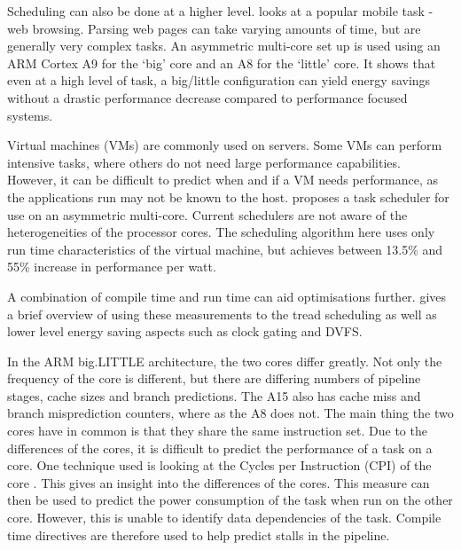 Scheduling can also be done at a higher level. 
\cite{zhu2013high} looks at a popular mobile task - web browsing. 
Parsing web pages can take varying amounts of time, but are generally very complex tasks. 
An asymmetric multi-core set up is used using an ARM Cortex A9 for the `big' core and an A8 for the `little' core. 
It shows that even at a high level of task, a big/little configuration can yield energy savings without a drastic performance decrease compared to performance focused systems.

Virtual machines (VMs) are commonly used on servers. 
Some VMs can perform intensive tasks, where others do not need large performance capabilities.
However, it can be difficult to predict when and if a VM needs performance, as the applications run may not be known to the host. 
\cite{wang2012energy} proposes a task scheduler for use on an asymmetric multi-core. 
Current schedulers are not aware of the heterogeneities of the processor cores. 
The scheduling algorithm here uses only run time characteristics of the virtual machine, but achieves between 13.5\% and 55\% increase in performance per watt.

A combination of compile time and run time can aid optimisations further. 
\cite{de2012power} gives a brief overview of using these measurements to the tread scheduling as well as lower level energy saving aspects such as clock gating and DVFS. 


In the ARM big.LITTLE architecture, the two cores differ greatly. 
Not only the frequency of the core is different, but there are differing numbers of pipeline stages, cache sizes and branch predictions.
The A15 also has cache miss and branch misprediction counters, where as the A8 does not. 
The main thing the two cores have in common is that they share the same instruction set. 
Due to the differences of the cores, it is difficult to predict the performance of a task on a core.
One technique used is looking at the Cycles per Instruction (CPI) of the core \cite{pricopi2013power}. 
This gives an insight into the differences of the cores. 
This measure can then be used to predict the power consumption of the task when run on the other core. 
However, this is unable to identify data dependencies of the task. 
Compile time directives are therefore used to help predict stalls in the pipeline. 


